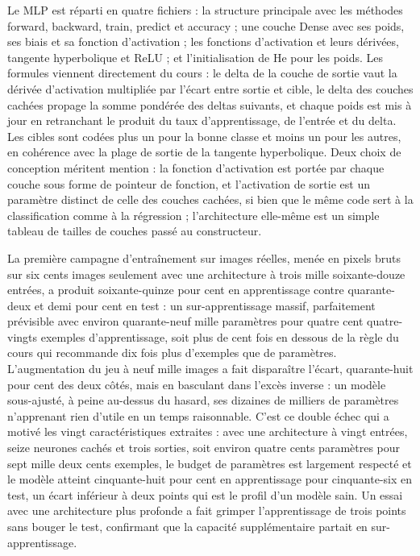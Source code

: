 \documentclass[11pt,a4paper]{report}
\begin{document}
Le MLP est réparti en quatre fichiers : la structure principale avec les
méthodes forward, backward, train, predict et accuracy ; une couche
Dense avec ses poids, ses biais et sa fonction d'activation ; les
fonctions d'activation et leurs dérivées, tangente hyperbolique et ReLU
; et l'initialisation de He pour les poids. Les formules viennent
directement du cours : le delta de la couche de sortie vaut la dérivée
d'activation multipliée par l'écart entre sortie et cible, le delta des
couches cachées propage la somme pondérée des deltas suivants, et chaque
poids est mis à jour en retranchant le produit du taux d'apprentissage,
de l'entrée et du delta. Les cibles sont codées plus un pour la bonne
classe et moins un pour les autres, en cohérence avec la plage de sortie
de la tangente hyperbolique. Deux choix de conception méritent mention :
la fonction d'activation est portée par chaque couche sous forme de
pointeur de fonction, et l'activation de sortie est un paramètre
distinct de celle des couches cachées, si bien que le même code sert à
la classification comme à la régression ; l'architecture elle-même est
un simple tableau de tailles de couches passé au constructeur.

La première campagne d'entraînement sur images réelles, menée en pixels
bruts sur six cents images seulement avec une architecture à trois mille
soixante-douze entrées, a produit soixante-quinze pour cent en
apprentissage contre quarante-deux et demi pour cent en test : un
sur-apprentissage massif, parfaitement prévisible avec environ
quarante-neuf mille paramètres pour quatre cent quatre-vingts exemples
d'apprentissage, soit plus de cent fois en dessous de la règle du cours
qui recommande dix fois plus d'exemples que de paramètres.
L'augmentation du jeu à neuf mille images a fait disparaître l'écart,
quarante-huit pour cent des deux côtés, mais en basculant dans l'excès
inverse : un modèle sous-ajusté, à peine au-dessus du hasard, ses
dizaines de milliers de paramètres n'apprenant rien d'utile en un temps
raisonnable. C'est ce double échec qui a motivé les vingt
caractéristiques extraites : avec une architecture à vingt entrées,
seize neurones cachés et trois sorties, soit environ quatre cents
paramètres pour sept mille deux cents exemples, le budget de paramètres
est largement respecté et le modèle atteint cinquante-huit pour cent en
apprentissage pour cinquante-six en test, un écart inférieur à deux
points qui est le profil d'un modèle sain. Un essai avec une
architecture plus profonde a fait grimper l'apprentissage de trois
points sans bouger le test, confirmant que la capacité supplémentaire
partait en sur-apprentissage.
\end{document}
